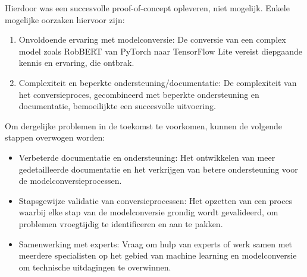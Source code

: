 Hierdoor was een succesvolle proof-of-concept opleveren, niet mogelijk. Enkele mogelijke oorzaken hiervoor zijn:

\begin{enumerate}
    \item Onvoldoende ervaring met modelconversie: De conversie van een complex model zoals RobBERT van PyTorch naar TensorFlow Lite vereist diepgaande kennis en ervaring, die ontbrak.
    \item Complexiteit en beperkte ondersteuning/documentatie: De complexiteit van het conversieproces, gecombineerd met beperkte ondersteuning en documentatie, bemoeilijkte een succesvolle uitvoering.
\end{enumerate}

Om dergelijke problemen in de toekomst te voorkomen, kunnen de volgende stappen overwogen worden:

\begin{itemize}
    \item Verbeterde documentatie en ondersteuning: Het ontwikkelen van meer gedetailleerde documentatie en het verkrijgen van betere ondersteuning voor de modelconversieprocessen.
    \item Stapsgewijze validatie van conversieprocessen: Het opzetten van een proces waarbij elke stap van de modelconversie grondig wordt gevalideerd, om problemen vroegtijdig te identificeren en aan te pakken.
    \item Samenwerking met experts: Vraag om hulp van experts of werk samen met meerdere specialisten op het gebied van machine learning en modelconversie om technische uitdagingen te overwinnen.
\end{itemize}

